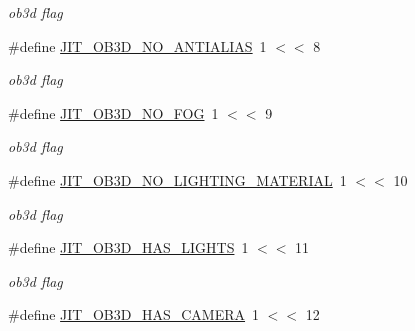 \begin{DoxyCompactItemize}
\begin{DoxyCompactList}\small\item\em ob3d flag \item\end{DoxyCompactList}\item 
\hypertarget{group__jitter_ga2ef1435359d9dca4722fb71db4b0d423}{
\#define \hyperlink{group__jitter_ga2ef1435359d9dca4722fb71db4b0d423}{JIT\_\-OB3D\_\-NO\_\-ANTIALIAS}~1 $<$$<$ 8}
\label{group__jitter_ga2ef1435359d9dca4722fb71db4b0d423}

\begin{DoxyCompactList}\small\item\em ob3d flag \item\end{DoxyCompactList}\item 
\hypertarget{group__jitter_gaf9c39790969f477fb42c3fe674eb5ca7}{
\#define \hyperlink{group__jitter_gaf9c39790969f477fb42c3fe674eb5ca7}{JIT\_\-OB3D\_\-NO\_\-FOG}~1 $<$$<$ 9}
\label{group__jitter_gaf9c39790969f477fb42c3fe674eb5ca7}

\begin{DoxyCompactList}\small\item\em ob3d flag \item\end{DoxyCompactList}\item 
\hypertarget{group__jitter_gaf7b319953ace69f17633be98233fd324}{
\#define \hyperlink{group__jitter_gaf7b319953ace69f17633be98233fd324}{JIT\_\-OB3D\_\-NO\_\-LIGHTING\_\-MATERIAL}~1 $<$$<$ 10}
\label{group__jitter_gaf7b319953ace69f17633be98233fd324}

\begin{DoxyCompactList}\small\item\em ob3d flag \item\end{DoxyCompactList}\item 
\hypertarget{group__jitter_ga1f032969c5d7b0adb353743e77736b96}{
\#define \hyperlink{group__jitter_ga1f032969c5d7b0adb353743e77736b96}{JIT\_\-OB3D\_\-HAS\_\-LIGHTS}~1 $<$$<$ 11}
\label{group__jitter_ga1f032969c5d7b0adb353743e77736b96}

\begin{DoxyCompactList}\small\item\em ob3d flag \item\end{DoxyCompactList}\item 
\hypertarget{group__jitter_ga1f324497fe983b02072b38d5c725ba2a}{
\#define \hyperlink{group__jitter_ga1f324497fe983b02072b38d5c725ba2a}{JIT\_\-OB3D\_\-HAS\_\-CAMERA}~1 $<$$<$ 12}
\label{group__jitter_ga1f324497fe983b02072b38d5c725ba2a}


\end{DoxyCompactItemize}
